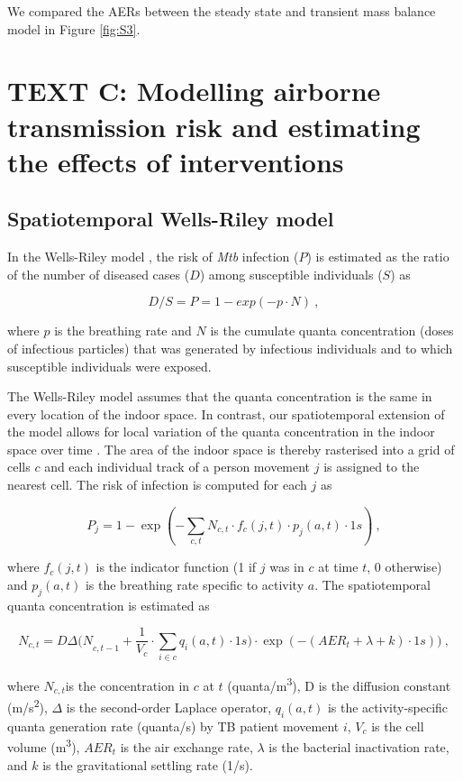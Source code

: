 \documentclass[11pt]{article}
\begin{document}
We compared the AERs between the steady state and transient mass balance model in Figure \ref{fig:S3}.   

\section{TEXT C: Modelling airborne transmission risk and estimating the effects of interventions}\label{text-c}

\subsection{Spatiotemporal Wells-Riley model}\label{spatiotemporal-wells-riley-model}

In the Wells-Riley model \cite{riley1978AmJEpidemiol}, the risk of \emph{Mtb} infection (\(P\)) is estimated as the ratio of the number of diseased cases (\(D\)) among susceptible individuals (\(S\)) as

\[D/S = P = 1 - exp( - p \cdot N)~,\]

where \(p\) is the breathing rate and \(N\) is the cumulate quanta concentration (doses of infectious particles) that was generated by infectious individuals and to which susceptible individuals were exposed.

The Wells-Riley model assumes that the quanta concentration is the same in every location of the indoor space. In contrast, our spatiotemporal extension of the model allows for local variation of the quanta concentration in the indoor space over time \cite{banholzer2025PLOSComputBiol}. The area of the indoor space is thereby rasterised into a grid of cells \(c\) and each individual track of a person movement \(j\) is assigned to the nearest cell. The risk of infection is computed for each \(j\) as

\[P_{j} = 1 - \exp( - \sum_{c,t}^{}N_{c,t} \cdot f_{c}(j,t) \cdot p_{j}(a,t) \cdot 1s)~,\]

where \(f_{c}(j,t)\) is the indicator function (1 if \(j\) was in \(c\) at time \(t\), 0 otherwise) and \(p_{j}(a,t)\) is the breathing rate specific to activity \(a\). The spatiotemporal quanta concentration is estimated as

\[N_{c,t} = D\Delta{(N}_{c,t - 1} + \frac{1}{V_{c}} \cdot \sum_{i \in c}^{}{q_{i}(a,t) \cdot 1s)} \cdot \exp( - (AER_{t} + \lambda + k) \cdot 1s))~,\]

where \(N_{c,t}\)is the concentration in \(c\) at \(t\) (quanta/m\textsuperscript{3}), D is the diffusion constant (m/s\textsuperscript{2}), \(\Delta\) is the second-order Laplace operator, \(q_{i}(a,t)\) is the activity-specific quanta generation rate (quanta/s) by TB patient movement \(i\), \(V_{c}\) is the cell volume (m\textsuperscript{3}), \(AER_{t}\) is the air exchange rate, \(\lambda\) is the bacterial inactivation rate, and \(k\) is the gravitational settling rate (1/s).
\end{document}
